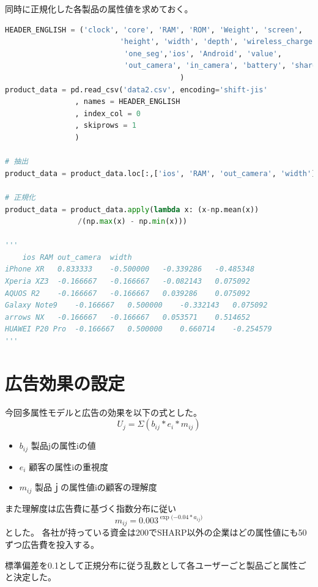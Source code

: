 \documentclass{jarticle}
\begin{document}
同時に正規化した各製品の属性値を求めておく。
\begin{lstlisting}[caption=正規化した各製品の属性値, frame=single, language=python]
HEADER_ENGLISH = ('clock', 'core', 'RAM', 'ROM', 'Weight', 'screen',
　　　　　　　　　　　　　　   'height', 'width', 'depth', 'wireless_charge',
　　　　　　　　　　　　　　    'one_seg','ios', 'Android', 'value', 
　　　　　　　　　　　　　　    'out_camera', 'in_camera', 'battery', 'share'
                                        )
product_data = pd.read_csv('data2.csv', encoding='shift-jis'
                , names = HEADER_ENGLISH
                , index_col = 0
                , skiprows = 1
                )

# 抽出
product_data = product_data.loc[:,['ios', 'RAM', 'out_camera', 'width']]

# 正規化
product_data = product_data.apply(lambda x: (x-np.mean(x))
　　　　　　　　　　/(np.max(x) - np.min(x)))
　　　　　　　　　　
'''
	ios	RAM	out_camera	width
iPhone XR	0.833333	-0.500000	-0.339286	-0.485348
Xperia XZ3	-0.166667	-0.166667	-0.082143	0.075092
AQUOS R2	-0.166667	-0.166667	0.039286	0.075092
Galaxy Note9	-0.166667	0.500000	-0.332143	0.075092
arrows NX	-0.166667	-0.166667	0.053571	0.514652
HUAWEI P20 Pro	-0.166667	0.500000	0.660714	-0.254579
'''
\end{lstlisting}

\section{広告効果の設定}
今回多属性モデルと広告の効果を以下の式とした。
$$U_j = \Sigma{(b_{ij}*e_i*m_{ij})}$$
\begin{itemize}
\item $b_{ij}$ 製品jの属性iの値
\item $e_i$ 顧客の属性iの重視度
\item $m_{ij}$ 製品ｊの属性値iの顧客の理解度
\end{itemize}

また理解度は広告費に基づく指数分布に従い
$$m_{ij} = 0.003^{\exp{(-0.04*a_{ij}})}$$
とした。
各社が持っている資金は200でSHARP以外の企業はどの属性値にも50ずつ広告費を投入する。

標準偏差を0.1として正規分布に従う乱数として各ユーザーごと製品ごと属性ごと決定した。
\end{document}
